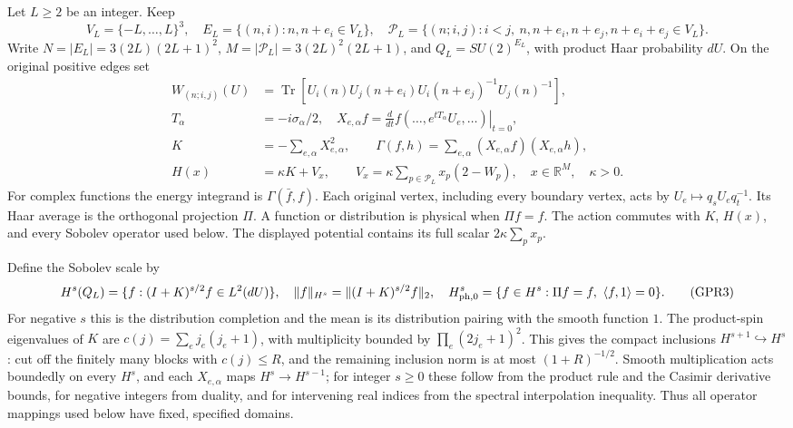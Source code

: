 \documentclass[11pt]{article}
\begin{document}
Let \(L\ge2\) be an integer. Keep
\[
 V_L=\{-L,\ldots,L\}^3,\quad
 E_L=\{(n,i):n,n+e_i\in V_L\},\quad
 \mathcal P_L=\{(n;i,j):i<j,\ n,n+e_i,n+e_j,n+e_i+e_j\in V_L\}.
 \tag{GPR1}
\]
Write \(N=|E_L|=3(2L)(2L+1)^2\), \(M=|\mathcal P_L|=3(2L)^2(2L+1)\), and \(Q_L=SU(2)^{E_L}\), with product Haar probability \(dU\). On the original positive edges set
\[
\begin{aligned}
 W_{(n;i,j)}(U)&=\operatorname{Tr}[U_i(n)U_j(n+e_i)U_i(n+e_j)^{-1}U_j(n)^{-1}],\\
 T_\alpha&=-i\sigma_\alpha/2,\quad
 X_{e,\alpha}f=\left.\frac d{dt}f(\ldots,e^{tT_\alpha}U_e,\ldots)\right|_{t=0},\\
 K&=-\sum_{e,\alpha}X_{e,\alpha}^2,\qquad
 \Gamma(f,h)=\sum_{e,\alpha}(X_{e,\alpha}f)(X_{e,\alpha}h),\\
 H(x)&=\kappa K+V_x,\qquad
 V_x=\kappa\sum_{p\in\mathcal P_L}x_p(2-W_p),\quad
 x\in\mathbb R^M,\quad\kappa>0.
\end{aligned}\tag{GPR2}
\]
For complex functions the energy integrand is \(\Gamma(\bar f,f)\). Each original vertex, including every boundary vertex, acts by \(U_e\mapsto q_sU_eq_t^{-1}\). Its Haar average is the orthogonal projection \(\Pi\). A function or distribution is physical when \(\Pi f=f\). The action commutes with \(K\), \(H(x)\), and every Sobolev operator used below. The displayed potential contains its full scalar \(2\kappa\sum_p x_p\).

Define the Sobolev scale by
\[
 H^s(Q_L)=\{f:(I+K)^{s/2}f\in L^2(dU)\},\quad
 \|f\|_{H^s}=\|(I+K)^{s/2}f\|_2,
\quad
 H^s_{\rm ph,0}=\{f\in H^s:\Pi f=f,\ \langle f,1\rangle=0\}.
 \tag{GPR3}
\]
For negative \(s\) this is the distribution completion and the mean is its distribution pairing with the smooth function \(1\). The product-spin eigenvalues of \(K\) are \(c(j)=\sum_ej_e(j_e+1)\), with multiplicity bounded by \(\prod_e(2j_e+1)^2\). This gives the compact inclusions \(H^{s+1}\hookrightarrow H^s\): cut off the finitely many blocks with \(c(j)\le R\), and the remaining inclusion norm is at most \((1+R)^{-1/2}\). Smooth multiplication acts boundedly on every \(H^s\), and each \(X_{e,\alpha}\) maps \(H^s\to H^{s-1}\); for integer \(s\ge0\) these follow from the product rule and the Casimir derivative bounds, for negative integers from duality, and for intervening real indices from the spectral interpolation inequality. Thus all operator mappings used below have fixed, specified domains.
\end{document}
